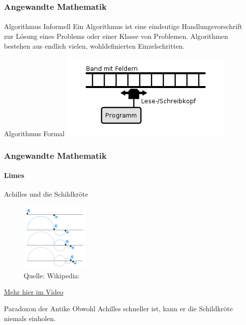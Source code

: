 \documentclass{beamer}
\begin{document}
\begin{frame}
    \frametitle{Angewandte Mathematik}
\framesubtitle{}
    \begin{block}{Algorithmus Informell}
Ein Algorithmus ist eine eindeutige Handlungsvorschrift zur Lösung eines Problems oder einer Klasse von Problemen. Algorithmen bestehen aus endlich vielen, wohldefinierten Einzelschritten.
\end{block}
    \begin{block}{Algorithmus Formal}
\includegraphics[scale=0.8]{images/Turingmaschine}
\end{block}
 \end{frame}



\begin{frame}
    \frametitle{Angewandte Mathematik}
\framesubtitle{Limes}
    \begin{block}{Achilles und die Schildkröte}
\begin{figure}[H]
      \centering
    \includegraphics[width=0.3\textwidth]{images/Zeno_Achilles_Paradox}
      \caption{Quelle: Wikipedia: }
\end{figure}
\href{https://www.youtube.com/watch?v=X8Qksx_Ng9k}{Mehr hier im Video}
\end{block}
  \begin{block}{Paradoxon der Antike}
 Obwohl Achilles schneller ist, kann er die Schildkröte niemals einholen.
\end{block}
 \end{frame}
\end{document}
